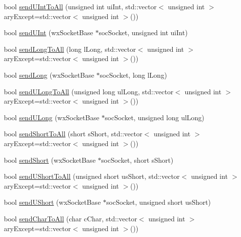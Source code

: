 \begin{DoxyCompactItemize}
\item 
bool \hyperlink{class_rad_jav_1_1_networking_1_1wx_widgets_t_c_p_server_acf4c247e2fe724e609fcb01cc25e32ef}{send\+U\+Int\+To\+All} (unsigned int ui\+Int, std\+::vector$<$ unsigned int $>$ ary\+Except=std\+::vector$<$ unsigned int $>$())
\item 
bool \hyperlink{class_rad_jav_1_1_networking_1_1wx_widgets_t_c_p_server_a5243c90bfca7fbc795378fb6db354133}{send\+U\+Int} (wx\+Socket\+Base $\ast$soc\+Socket, unsigned int ui\+Int)
\item 
bool \hyperlink{class_rad_jav_1_1_networking_1_1wx_widgets_t_c_p_server_a18d917dda51ecaf74fb4eba9199739fb}{send\+Long\+To\+All} (long l\+Long, std\+::vector$<$ unsigned int $>$ ary\+Except=std\+::vector$<$ unsigned int $>$())
\item 
bool \hyperlink{class_rad_jav_1_1_networking_1_1wx_widgets_t_c_p_server_a709a3b683a2c1762e9a056602d661b75}{send\+Long} (wx\+Socket\+Base $\ast$soc\+Socket, long l\+Long)
\item 
bool \hyperlink{class_rad_jav_1_1_networking_1_1wx_widgets_t_c_p_server_a81dbac34c1d61a0de86194f69003b07e}{send\+U\+Long\+To\+All} (unsigned long ul\+Long, std\+::vector$<$ unsigned int $>$ ary\+Except=std\+::vector$<$ unsigned int $>$())
\item 
bool \hyperlink{class_rad_jav_1_1_networking_1_1wx_widgets_t_c_p_server_a14e6caced7c760a10fde1c62282c3cbd}{send\+U\+Long} (wx\+Socket\+Base $\ast$soc\+Socket, unsigned long ul\+Long)
\item 
bool \hyperlink{class_rad_jav_1_1_networking_1_1wx_widgets_t_c_p_server_abb4c3296294a0ed6795bc0e0a70b8055}{send\+Short\+To\+All} (short s\+Short, std\+::vector$<$ unsigned int $>$ ary\+Except=std\+::vector$<$ unsigned int $>$())
\item 
bool \hyperlink{class_rad_jav_1_1_networking_1_1wx_widgets_t_c_p_server_a6c25241905ed26002181c0341ff776bf}{send\+Short} (wx\+Socket\+Base $\ast$soc\+Socket, short s\+Short)
\item 
bool \hyperlink{class_rad_jav_1_1_networking_1_1wx_widgets_t_c_p_server_a173290e650c00590aca54c4833b5437d}{send\+U\+Short\+To\+All} (unsigned short us\+Short, std\+::vector$<$ unsigned int $>$ ary\+Except=std\+::vector$<$ unsigned int $>$())
\item 
bool \hyperlink{class_rad_jav_1_1_networking_1_1wx_widgets_t_c_p_server_af35fd9d609a7270df6948e8b0995a027}{send\+U\+Short} (wx\+Socket\+Base $\ast$soc\+Socket, unsigned short us\+Short)
\item 
bool \hyperlink{class_rad_jav_1_1_networking_1_1wx_widgets_t_c_p_server_ac63ebebde7e7aa4b5c4b75af3ab3d290}{send\+Char\+To\+All} (char c\+Char, std\+::vector$<$ unsigned int $>$ ary\+Except=std\+::vector$<$ unsigned int $>$())

\end{DoxyCompactItemize}
